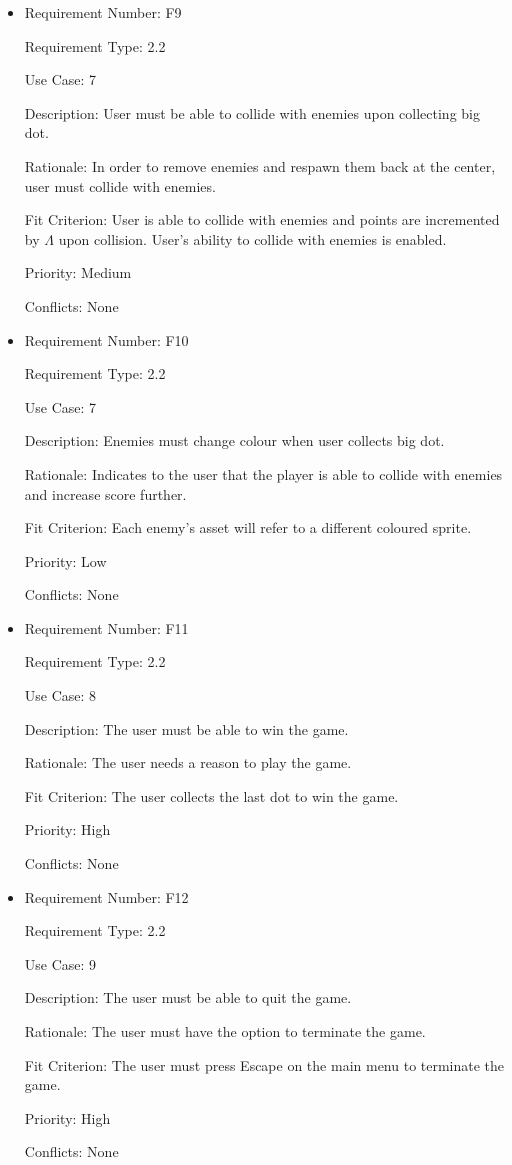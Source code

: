 \documentclass[12pt, titlepage]{article}
\begin{document}
\begin{itemize}
\item
Requirement Number: \hypertarget{f9}{F9}

Requirement Type: 2.2

Use Case: 7

Description: User must be able to collide with enemies upon collecting big dot.

Rationale: In order to remove enemies and respawn them back at the center, user must collide with enemies.

Fit Criterion: User is able to collide with enemies and points are incremented by $\hyperref[tab:constants]{\Lambda}$ upon collision. User's ability to collide with enemies is enabled.

Priority: Medium

Conflicts: None
\end{itemize}

\begin{itemize}
\item
Requirement Number: \hypertarget{f10}{F10}

Requirement Type: 2.2

Use Case: 7

Description: Enemies must change colour when user collects big dot.

Rationale: Indicates to the user that the player is able to collide with enemies and increase score further.

Fit Criterion: Each enemy's asset will refer to a different coloured sprite.

Priority: Low

Conflicts: None
\end{itemize}

\begin{itemize}
\item
Requirement Number: \hypertarget{f11}{F11}

Requirement Type: 2.2

Use Case: 8

Description: The user must be able to win the game.

Rationale: The user needs a reason to play the game.

Fit Criterion: The user collects the last dot to win the game.

Priority: High

Conflicts: None
\end{itemize}

\begin{itemize}
\item
Requirement Number: \hypertarget{f12}{F12}

Requirement Type: 2.2

Use Case: 9

Description: The user must be able to quit the game.

Rationale: The user must have the option to terminate the game.

Fit Criterion: The user must press Escape on the main menu to terminate the game.

Priority: High

Conflicts: None
\end{itemize}
\end{document}
